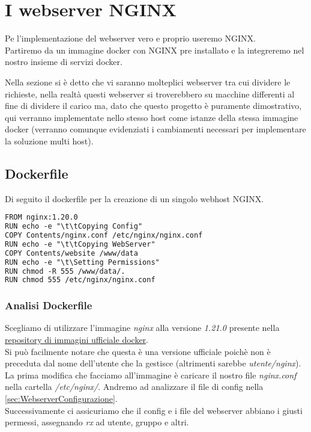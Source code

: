 \documentclass[../DocumentazioneProgetto.tex]{subfiles}
\begin{document}
	\section{I webserver NGINX}
	\label{sec:Webserver}
	Pe l'implementazione del webserver vero e proprio useremo NGINX.\\
	Partiremo da un immagine docker con NGINX pre installato e la integreremo nel nostro insieme di servizi docker.

	Nella sezione \textit{} si è detto che vi saranno molteplici webserver tra cui dividere le richieste,
	nella realtà questi webserver si troverebbero su macchine differenti al fine di dividere il carico ma, dato che questo progetto è puramente dimostrativo, qui verranno implementate nello stesso host come istanze della stessa immagine docker (verranno comunque evidenziati i cambiamenti necessari per implementare la soluzione multi host).
	\subsection{Dockerfile} 
	\label{sec:WebserverDockerfile}
	Di seguito il dockerfile per la creazione di un singolo webhost NGINX.
	\begin{lstlisting}[language=XML, caption=Dockerfile Webserver NGINX] 
FROM nginx:1.20.0
RUN echo -e "\t\tCopying Config"
COPY Contents/nginx.conf /etc/nginx/nginx.conf
RUN echo -e "\t\tCopying WebServer"
COPY Contents/website /www/data
RUN echo -e "\t\Setting Permissions"
RUN chmod -R 555 /www/data/.
RUN chmod 555 /etc/nginx/nginx.conf\end{lstlisting}
	\subsubsection{Analisi Dockerfile} 
	Scegliamo di utilizzare l'immagine \textit{nginx} alla versione \textit{1.21.0} presente nella \href{https://hub.docker.com/_/nginx}{repository di immagini ufficiale docker}.\\ 
	Si può facilmente notare che questa è una versione ufficiale poichè non	è preceduta dal nome dell'utente che la gestisce 
	(altrimenti sarebbe \textit{utente/nginx}).\\
	La prima modifica che facciamo all'immagine è caricare il nostro file \textit{nginx.conf} nella cartella \textit{/etc/nginx/}. Andremo ad analizzare il file di config nella \autoref{sec:WebserverConfigurazione}.\\
	Successivamente ci assicuriamo che il config e i file del webserver abbiano i giusti permessi, assegnando \textit{rx} ad utente, gruppo e altri. 
\end{document}
